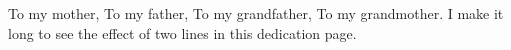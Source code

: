 \TAMUDedicationFormat
\begin{center}
\vspace*{\fill}
To my mother, To my father, To my grandfather, To my grandmother. I make it long to see the effect of two lines in this dedication page.
\vspace*{\fill}
\end{center}


